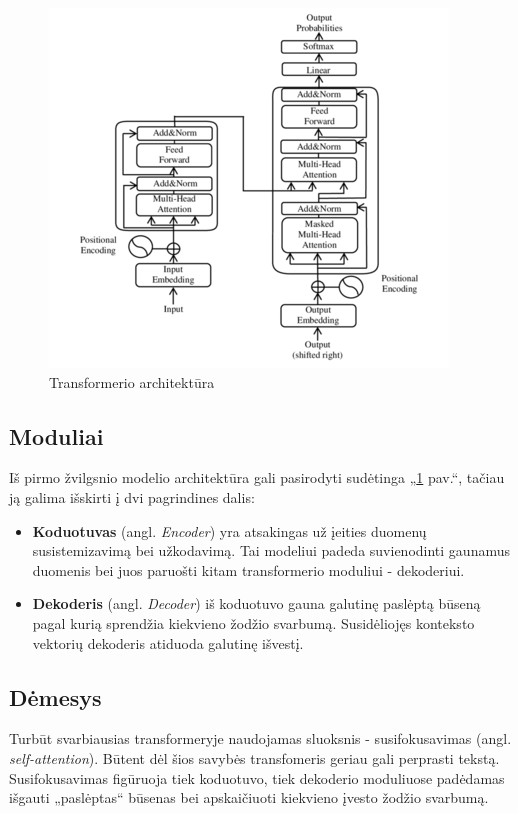 \documentclass[conference]{IEEEtran}
\begin{document}
\begin{figure}
    \centering
    \includegraphics[scale=0.65]{transformer.png}
    \caption{Transformerio architektūra}
    \label{pav:1}
\end{figure}

\subsection{Moduliai}
Iš pirmo žvilgsnio modelio architektūra gali pasirodyti sudėtinga „\ref{pav:1} pav.“, tačiau ją galima išskirti į dvi pagrindines dalis:
\begin{itemize}
  \item \textbf{Koduotuvas} (angl. \textit{Encoder}) yra atsakingas už įeities duomenų susistemizavimą bei užkodavimą. Tai modeliui padeda suvienodinti gaunamus duomenis bei juos paruošti kitam transformerio moduliui - dekoderiui.
  \item \textbf{Dekoderis} (angl. \textit{Decoder}) iš koduotuvo gauna galutinę paslėptą būseną pagal kurią sprendžia kiekvieno žodžio svarbumą. Susidėliojęs konteksto vektorių dekoderis atiduoda galutinę išvestį.
\end{itemize}
\subsection{Dėmesys}
Turbūt svarbiausias transformeryje naudojamas sluoksnis - susifokusavimas (angl. \textit{self-attention}). Būtent dėl šios savybės transfomeris geriau gali perprasti tekstą. Susifokusavimas figūruoja tiek koduotuvo, tiek dekoderio moduliuose padėdamas išgauti „paslėptas“ būsenas bei apskaičiuoti kiekvieno įvesto žodžio svarbumą. 
\end{document}
